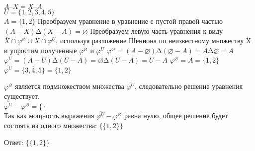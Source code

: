 \documentclass[a4paper,14pt]{extarticle}
\begin{document}
	
	\noindent$A – X = X– A$\\
	$U=\{1,2,3,4,5\}$\\
	$A=\{1,2\}$\bigbreak
	\noindent Преобразуем уравнение в уравнение с пустой правой частью\\
	$(A-X)∆(X-A)=\varnothing$\bigbreak
	\noindent Преобразуем левую часть уравнения к виду $\overline{X}\cap \varphi ^ \varnothing \cup X \cap \varphi ^ U$, используя разложение Шеннона по неизвестному множеству X и упростим полученные $\varphi ^ \varnothing$ и $\varphi ^ U$\bigbreak
	\noindent $\varphi ^ \varnothing = (A-\varnothing)∆(\varnothing - A) = A∆\varnothing = A$\\
	$\varphi ^ U = (A-U)∆(U - A) = \varnothing ∆ (U - A) = U - A$\bigbreak
\noindent	$\varphi ^ \varnothing = A = \{1, 2\}$\\
	$\overline{\varphi ^ U} = \overline{\{3, 4, 5\}} = \{1, 2\}$\bigbreak
	
	\noindent $\varphi ^ \varnothing$ является подмножеством множества $\overline{\varphi ^ U}$, следовательно решение уравнения существует.\\
	$\overline{\varphi ^ U} - \varphi ^ \varnothing = \{\}$\\
	Так как мощность выражения $\overline{\varphi ^ U} - \varphi ^ \varnothing$ равна нулю, общее решение будет состоять из одного множества: $\{\{1, 2\}\}$\bigbreak
	
	Ответ: $\{\{1, 2\}\}$
	
	
\end{document}
